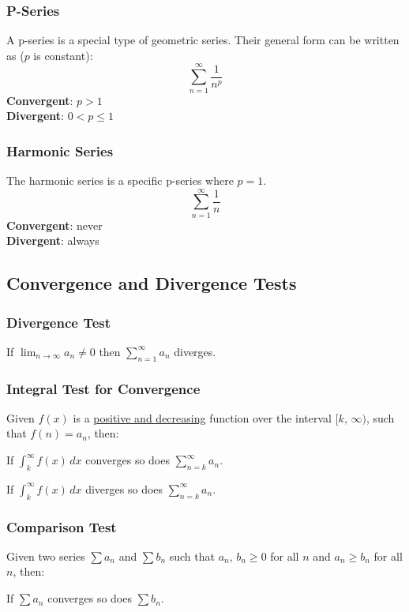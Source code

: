 \documentclass[12pt]{article}
\begin{document}
\subsubsection{P-Series}
A p-series is a special type of geometric series. Their general form can be written as ($p$ is constant):
\[ \sum_{n=1}^\infty \frac{1}{n^p} \]
\textbf{Convergent}: $p > 1$
\\ \textbf{Divergent}: $0 < p \le 1$

\subsubsection{Harmonic Series}
The harmonic series is a specific p-series where $p=1$.
\[ \sum_{n=1}^\infty \frac{1}{n} \]
\textbf{Convergent}: never
\\ \textbf{Divergent}: always

\subsection{Convergence and Divergence Tests}
\subsubsection{Divergence Test}
If $\displaystyle \lim_{n \to \infty} a_n \ne 0$ then $\displaystyle \sum_{n=1}^\infty a_n$ diverges.

\subsubsection{Integral Test for Convergence}
Given $f(x)$ is a \underline{positive and decreasing} function over the interval $[k, \, \infty)$, such that $f(n) = a_n$, then:

\noindent If $\displaystyle \int_k^\infty f(x) \, dx$ converges so does $\displaystyle \sum_{n=k}^\infty a_n$.

\noindent If $\displaystyle \int_k^\infty f(x) \, dx$ diverges so does $\displaystyle \sum_{n=k}^\infty a_n$.

\subsubsection{Comparison Test}
Given two series $\displaystyle \sum a_n$ and $\displaystyle \sum b_n$ such that $a_n, \, b_n \ge 0$ for all $n$ and $a_n \ge b_n$ for all $n$, then:

\noindent If $\displaystyle \sum a_n$ converges so does $\displaystyle \sum b_n$.
\end{document}

